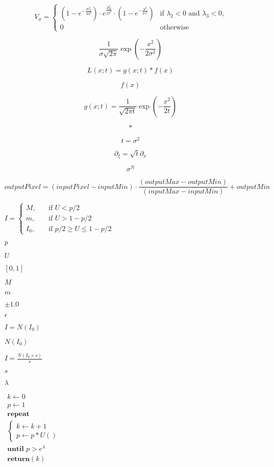 \documentclass{article}
\begin{document}
\[ V_{\sigma}= \begin{cases} (1-e^{-\frac{R_A^2}{2\alpha^2}}) \cdot e^{\frac{R_B^2}{2\beta^2}} \cdot (1-e^{-\frac{S^2}{2\gamma^2}}) & \text{if } \lambda_2<0 \text{ and } \lambda_3<0 \text{,}\\ 0 & \text{otherwise} \end{cases} \]
\pagebreak

\[ \frac{ 1 }{ \sigma \sqrt{ 2 \pi } } \exp{ \left( - \frac{x^2}{ 2 \sigma^2 } \right) } \]
\pagebreak

\[ L(x; t) = g(x; t) \ast f(x) \]
\pagebreak

\[ f(x) \]
\pagebreak

\[ g(x; t) = \frac{1}{ \sqrt{ 2 \pi t} } \exp{ \left( -\frac{x^2}{ 2 t } \right) } \]
\pagebreak

\[\ast\]
\pagebreak

\[ t = \sigma^2 \]
\pagebreak

\[ \partial_\xi = \sqrt{t} \partial_x \]
\pagebreak

\[ \sigma^N \]
\pagebreak

\[ outputPixel = ( inputPixel - inputMin) \cdot \frac{(outputMax - outputMin )}{(inputMax - inputMin)} + outputMin \]
\pagebreak

$ I = \begin{cases} M, & \quad \text{if } U < p/2 \\ m, & \quad \text{if } U > 1 - p/2 \\ I_0, & \quad \text{if } p/2 \geq U \leq 1 - p/2 \end{cases} $
\pagebreak

$ p $
\pagebreak

$ U $
\pagebreak

$ [0,1] $
\pagebreak

$ M $
\pagebreak

$ m $
\pagebreak

$\pm 1.0$
\pagebreak

$ \epsilon $
\pagebreak

$ I = N(I_0) $
\pagebreak

$ N(I_0) $
\pagebreak

$ I = \frac{N(I_0 \times s)}{s} $
\pagebreak

$ s $
\pagebreak

$ \lambda $
\pagebreak

$ \begin{array}{l} k \leftarrow 0 \\ p \leftarrow 1 \\ \textbf{repeat} \\ \left\{ \begin{array}{l} k \leftarrow k+1 \\ p \leftarrow p \ast U() \end{array} \right. \\ \textbf{until } p > e^{\lambda} \\ \textbf{return} (k) \end{array} $
\pagebreak
\end{document}
